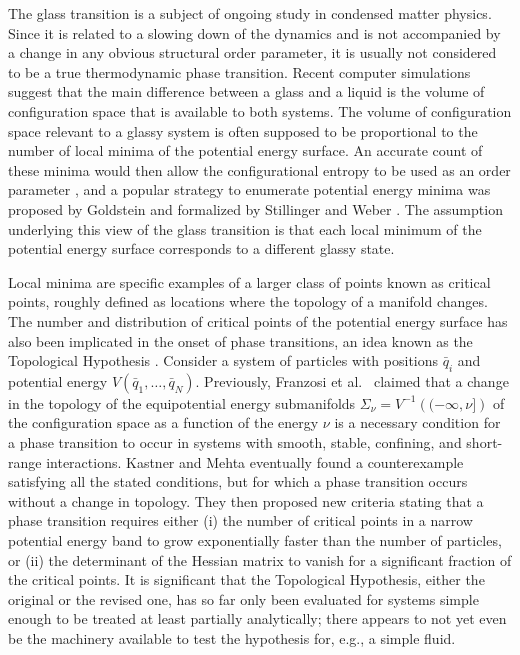 \documentclass[default,iicol]{sn-jnl}%
\theoremstyle{thmstyleone}%
\theoremstyle{thmstyletwo}%
\theoremstyle{thmstylethree}%
\providecommand{\etal}{et al.\ }
\renewcommand{\vec}[1]{\bar{#1}}
\begin{document}
The glass transition is a subject of ongoing study in condensed matter physics. Since it is related to a slowing down of the dynamics and is not accompanied by a change in any obvious structural order parameter, it is usually not considered to be a true thermodynamic phase transition. Recent computer simulations \cite{berthier2019perspective} suggest that the main difference between a glass and a liquid is the volume of configuration space that is available to both systems. The volume of configuration space relevant to a glassy system is often supposed to be proportional to the number of local minima of the potential energy surface. An accurate count of these minima would then allow the configurational entropy to be used as an order parameter \cite{berthier2019perspective}, and a popular strategy to enumerate potential energy minima was proposed by Goldstein \cite{goldstein1969viscous} and formalized by Stillinger and Weber \cite{stillinger1982hidden,stillinger1995topographic}. The assumption underlying this view of the glass transition is that each local minimum of the potential energy surface corresponds to a different glassy state.

Local minima are specific examples of a larger class of points known as critical points, roughly defined as locations where the topology of a manifold changes. The number and distribution of critical points of the potential energy surface has also been implicated in the onset of phase transitions, an idea known as the Topological Hypothesis \cite{caiani1997geometry,franzosi2004theorem}. Consider a system of particles with positions $\vec{q}_i$ and potential energy $V(\vec{q}_1,\dots,\vec{q}_N)$. Previously, Franzosi \etal \cite{franzosi2007topology1,franzosi2007topology2,gori2018topological} claimed that a change in the topology of the equipotential energy submanifolds $\Sigma_\nu = V^{-1}\left((-\infty, \nu]\right)$ of the configuration space as a function of the energy $\nu$ is a necessary condition for a phase transition to occur in systems with smooth, stable, confining, and short-range interactions. Kastner and Mehta \cite{kastner2011phase} eventually found a counterexample satisfying all the stated conditions, but for which a phase transition occurs without a change in topology. They then proposed new criteria stating that a phase transition requires either (i) the number of critical points in a narrow potential energy band to grow exponentially faster than the number of particles, or (ii) the determinant of the Hessian matrix to vanish for a significant fraction of the critical points. It is significant that the Topological Hypothesis, either the original or the revised one, has so far only been evaluated for systems simple enough to be treated at least partially analytically; there appears to not yet even be the machinery available to test the hypothesis for, e.g., a simple fluid.
\end{document}
